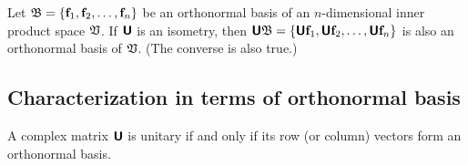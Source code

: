 Let ${\frak B}=\{{\bf f}_1,  {\bf f}_2, \ldots , {\bf f}_n\}$
be an orthonormal basis of an $n$-dimensional inner product space ${\frak V}$.
If
$\textsf{\textbf{U}}$ is an isometry, then
 $\textsf{\textbf{U}}{\frak B}=\{\textsf{\textbf{U}}{\bf f}_1, \textsf{\textbf{U}} {\bf f}_2,
\ldots ,\textsf{\textbf{U}} {\bf f}_n\}$
is also an orthonormal basis of  ${\frak V}$.
(The converse is also true.)

\subsection {Characterization in terms of orthonormal basis}



A complex matrix $\textsf{\textbf{U}}$ is unitary if and only if its row (or column) vectors form
an orthonormal basis.

